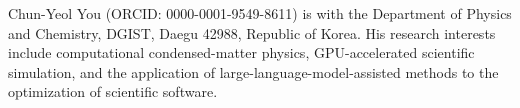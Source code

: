 \documentclass{ieeeaccess}
\begin{document}
\begin{IEEEbiographynophoto}{Chun-Yeol You}
(ORCID: 0000-0001-9549-8611) is with the Department of Physics and Chemistry, DGIST, Daegu 42988,
Republic of Korea. His research interests include computational condensed-matter physics,
GPU-accelerated scientific simulation, and the application of large-language-model-assisted methods
to the optimization of scientific software.
\end{IEEEbiographynophoto}

\EOD
\end{document}

